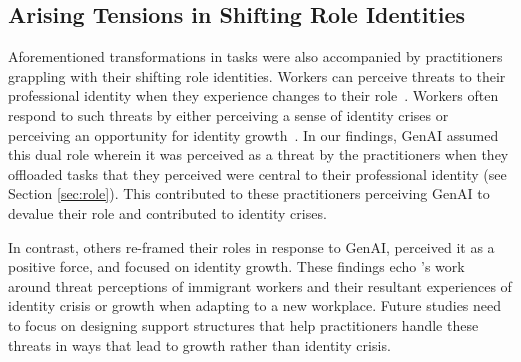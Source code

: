 \subsection{Arising Tensions in Shifting Role Identities}
Aforementioned transformations in tasks were also accompanied by practitioners grappling with their shifting role identities.  Workers can perceive threats to their professional identity when they experience changes to their role~\cite{petriglieri2011under}. Workers often respond to such threats by either perceiving a sense of identity crises or perceiving an opportunity for identity growth~\cite{zikic2016happens}. In our findings, GenAI assumed this dual role wherein it was perceived as a threat by the practitioners when they offloaded tasks that they perceived were central to their professional identity (see Section \ref{sec:role}). This contributed to these practitioners perceiving GenAI to devalue their role and contributed to identity crises.

In contrast, others re-framed their roles in response to GenAI, perceived it as a positive force, and focused on identity growth. These findings echo \cite{zikic2016happens}'s work around threat perceptions of immigrant workers and their resultant experiences of identity crisis or growth when adapting to a new workplace. Future studies need to focus on designing support structures that help practitioners handle these threats in ways that lead to growth rather than identity crisis.

